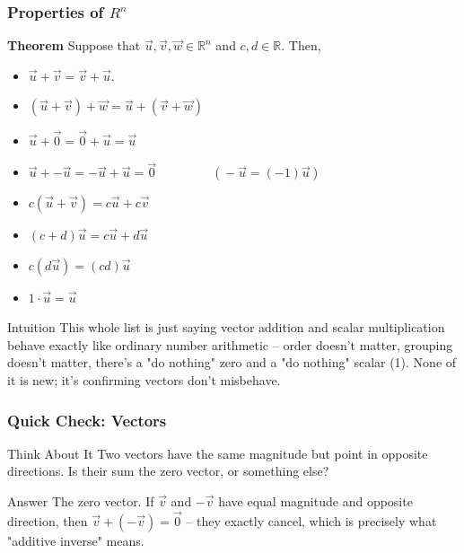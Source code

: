   \begin{frame}[fragile]\frametitle{Properties of $R^n$}
\textbf{Theorem}  Suppose that $\vec{u}, \vec{v},\vec{w}\in \mathbb R^n$ and $c,d\in \mathbb R$.  Then,
\begin{itemize}
 \item $\vec{u} + \vec{v} = \vec{v} + \vec{u}$.
 \item $(\vec{u} + \vec{v} ) + \vec{w} = 
        \vec{u} + ( \vec{v} + \vec{w})$
 \item $\vec{u} + \vec{0} = \vec{0} +\vec{u} = \vec{u}$
 \item $\vec{u} + -\vec{u} = -\vec{u}+ \vec{u} = \vec{0}$
 $\qquad \qquad$ ($\ -\vec{u} = (-1)\vec{u}\ $)
 \item $c(\vec{u} + \vec{v} ) = c\vec{u} + c\vec{v}$
 \item $(c+d)\vec{u} = c\vec{u} + d\vec{u}$
 \item $c(d\vec{u}) = (cd)\vec{u}$
 \item $1 \cdot \vec{u} =\vec{u}$
\end{itemize}

\begin{block}{Intuition}
This whole list is just saying vector addition and scalar multiplication behave exactly like ordinary number arithmetic -- order doesn't matter, grouping doesn't matter, there's a "do nothing" zero and a "do nothing" scalar (1). None of it is new; it's confirming vectors don't misbehave.
\end{block}

\end{frame}

\begin{frame}[fragile]\frametitle{Quick Check: Vectors}
\begin{block}{Think About It}
Two vectors have the same magnitude but point in opposite directions. Is their sum the zero vector, or something else?
\end{block}
\pause
\begin{block}{Answer}
The zero vector. If $\vec{v}$ and $-\vec{v}$ have equal magnitude and opposite direction, then $\vec{v} + (-\vec{v}) = \vec{0}$ -- they exactly cancel, which is precisely what "additive inverse" means.
\end{block}
\end{frame}

